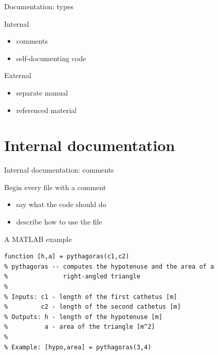 \documentclass[10pt]{beamer}
\begin{document}
\begin{frame}{Documentation: types} %

	\large
	\begin{block}{Internal}
		\begin{itemize}
			\item comments
			\item self-documenting code
		\end{itemize}
	\end{block}

	\bigskip

	\begin{block}{External}
		\begin{itemize}
			\item separate manual
			\item referenced material
		\end{itemize}
	\end{block}

\end{frame}

\section{Internal documentation} %

\begin{frame}[fragile]{Internal documentation: comments} %

	\begin{block}{Begin every file with a comment}
		\begin{itemize}
			\item say what the code should do
			\item describe how to use the file
		\end{itemize}
	\end{block}

	\begin{block}{A MATLAB example}
\begin{verbatim}
function [h,a] = pythagoras(c1,c2)
% pythagoras -- computes the hypotenuse and the area of a
%               right-angled triangle
%
% Inputs: c1 - length of the first cathetus [m]
%         c2 - length of the second cathetus [m]
% Outputs: h - length of the hypotenuse [m]
%          a - area of the triangle [m^2]
%
% Example: [hypo,area] = pythagoras(3,4)
\end{verbatim}
	\end{block}

\end{frame}
\end{document}
